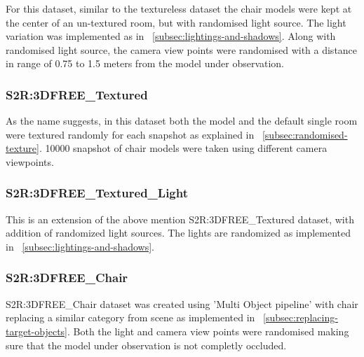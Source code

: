     For this dataset, similar to the textureless dataset the chair models were kept at the center of an un-textured room, but with randomised light source.
    The light variation was implemented as in ~\ref{subsec:lightings-and-shadows}.
    Along with randomised light source, the camera view points were randomised with a distance in range of 0.75 to 1.5 meters from the model under observation.

\subsubsection{S2R:3DFREE\_Textured}

    As the name suggests, in this dataset both the model and the default single room were textured randomly for each snapshot as explained in ~\ref{subsec:randomised-texture}.
    10000 snapshot of chair models were taken using different camera viewpoints.

\subsubsection{S2R:3DFREE\_Textured\_Light}

    This is an extension of the above mention S2R:3DFREE\_Textured dataset, with addition of randomized light sources.
    The lights are randomized as implemented in ~\ref{subsec:lightings-and-shadows}.

\subsubsection{S2R:3DFREE\_Chair}

    S2R:3DFREE\_Chair dataset was created using 'Multi Object pipeline' with chair replacing a similar category from scene as implemented in ~\ref{subsec:replacing-target-objects}.
    Both the light and camera view points were randomised making sure that the model under observation is not completly occluded.


